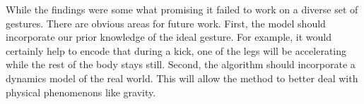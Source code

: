 \documentclass{article}
\begin{document}
While the findings were some what promising it failed to work on a diverse set
of gestures. There are obvious areas for future work. First, the model should
incorporate our prior knowledge of the ideal gesture. For example, it would
certainly help to encode that during a kick, one of the legs will be
accelerating while the rest of the body stays still. Second, the algorithm
should incorporate a dynamics model of the real world. This will allow the
method to better deal with physical phenomenons like gravity.







\end{document}
